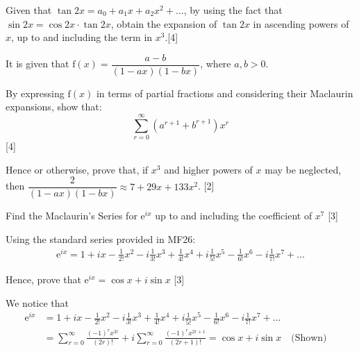 \documentclass[12pt, a4 paper]{article}
\begin{document}
\begin{outline}[enumerate]
 \1 Given that \(\tan{2x}=a_{0}+a_{1}x+a_{2}x^2+\dots \), by using the fact that \(\sin{2x}=\cos{2x}\cdot \tan{2x}\), obtain the expansion of \(\tan{2x}\) in ascending powers of \(x\), up to and including the term in \(x^3\).\hfill[4] %

 \1 It is given that \(\textrm{f}(x)=\dfrac{a-b}{(1-ax)(1-bx)}\), where \(a,b>0\). %

 \2 By expressing \(\textrm{f}(x)\) in terms of partial fractions and considering their Maclaurin expansions, show that:
 \begin{equation*}
  \sum_{r=0}^{\infty}(a^{r+1}+b^{r+1})x^{r}
 \end{equation*}\hfill[4]

 \2 Hence or otherwise, prove that, if \(x^3\) and higher powers of \(x\) may be neglected, then \(\dfrac{2}{(1-ax)(1-bx)} \approx 7+29x+133x^2\).
 \hfill[2]

 \1 Find the Maclaurin's Series for \(\mathrm{e}^{ix}\) up to and including the coefficient of \(x^7\) \hfill[3]
 \begin{answer}
  Using the standard series provided in MF26:
  \begin{align*}
   \mathrm{e}^{ix} = 1 + ix - \frac{1}{2!}x^2 - i\frac{1}{3!}x^3 + \frac{1}{4!}x^4 + i\frac{1}{5!}x^5 - \frac{1}{6!}x^6 - i\frac{1}{7!}x^7+ \dots
  \end{align*}
 \end{answer}
 Hence, prove that \(\mathrm{e}^{ix} = \cos x + i\sin x\) \hfill[3] %
 \begin{answer}
  We notice that
  \begin{align*}
   \mathrm{e}^{ix} & = 1 + ix - \frac{1}{2!}x^2 - i\frac{1}{3!}x^3 + \frac{1}{4!}x^4 + i\frac{1}{5!}x^5 - \frac{1}{6!}x^6 - i\frac{1}{7!}x^7+ \dots                             \\
                   & = \sum_{r=0}^{\infty} \frac{{(-1)}^r x^{2r}}{(2r)!} + i\sum_{r=0}^{\infty} \frac{{(-1)}^r x^{2r+1}}{(2r+1)!} = \cos x + i\sin x \quad\textrm{(Shown)}\quad
  \end{align*}
 \end{answer}
\end{outline}
\end{document}
